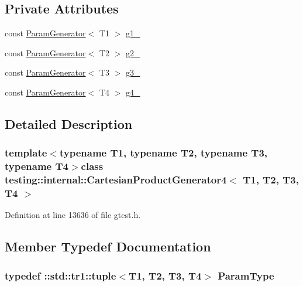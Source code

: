 \subsection*{\-Private \-Attributes}
\begin{DoxyCompactItemize}
\item 
const \hyperlink{classtesting_1_1internal_1_1ParamGenerator}{\-Param\-Generator}$<$ \-T1 $>$ \hyperlink{classtesting_1_1internal_1_1CartesianProductGenerator4_a315f81360fc67b016cbf514cb78c1975}{g1\-\_\-}
\item 
const \hyperlink{classtesting_1_1internal_1_1ParamGenerator}{\-Param\-Generator}$<$ \-T2 $>$ \hyperlink{classtesting_1_1internal_1_1CartesianProductGenerator4_a4bd40d1fbb8c6d2895b5201e62afbe38}{g2\-\_\-}
\item 
const \hyperlink{classtesting_1_1internal_1_1ParamGenerator}{\-Param\-Generator}$<$ \-T3 $>$ \hyperlink{classtesting_1_1internal_1_1CartesianProductGenerator4_acda98d4bf8f619856fb2e0ec015b9bc8}{g3\-\_\-}
\item 
const \hyperlink{classtesting_1_1internal_1_1ParamGenerator}{\-Param\-Generator}$<$ \-T4 $>$ \hyperlink{classtesting_1_1internal_1_1CartesianProductGenerator4_a1b3cef374aa9be9fbd4ed12caa7db9b5}{g4\-\_\-}
\end{DoxyCompactItemize}


\subsection{\-Detailed \-Description}
\subsubsection*{template$<$typename T1, typename T2, typename T3, typename T4$>$class testing\-::internal\-::\-Cartesian\-Product\-Generator4$<$ T1, T2, T3, T4 $>$}



\-Definition at line 13636 of file gtest.\-h.



\subsection{\-Member \-Typedef \-Documentation}
\hypertarget{classtesting_1_1internal_1_1CartesianProductGenerator4_a99c0f82cb1095cf66d28100490e9fa39}{
\subsubsection[{\-Param\-Type}]{\setlength{\rightskip}{0pt plus 5cm}typedef \-::{\bf std\-::tr1\-::tuple}$<$\-T1, \-T2, \-T3, \-T4$>$ {\bf \-Param\-Type}}}\label{d9/d3a/classtesting_1_1internal_1_1CartesianProductGenerator4_a99c0f82cb1095cf66d28100490e9fa39}


